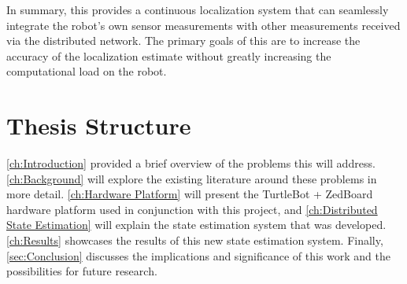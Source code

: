 \documentclass[thesis.tex]{subfile}
\begin{document}
In summary, this provides a continuous localization system that can seamlessly integrate the robot's own sensor measurements with other measurements received via the distributed network. The primary goals of this are to increase the accuracy of the localization estimate %
without greatly increasing the computational load on the robot.

\section{Thesis Structure} %
\autoref{ch:Introduction} provided a brief overview of the problems this will address. \autoref{ch:Background} will explore the existing literature around these problems in more detail. \autoref{ch:Hardware Platform} will present the TurtleBot + ZedBoard hardware platform used in conjunction with this project, and \autoref{ch:Distributed State Estimation} will explain the state estimation system that was developed. \autoref{ch:Results} showcases the results of this new state estimation system. Finally, \autoref{sec:Conclusion} discusses the implications and significance of this work and the possibilities for future research.
\end{document}
